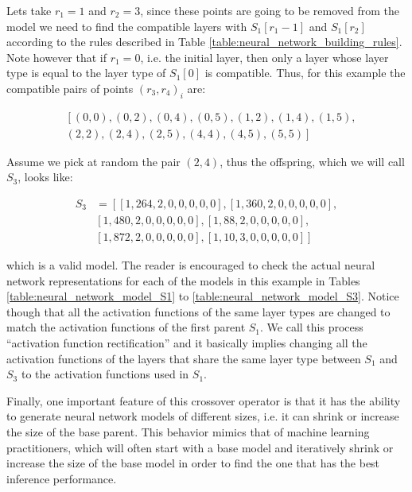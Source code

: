 \documentclass[journal]{IEEEtran}
\begin{document}
Lets take $r_1 = 1$ and $r_2 = 3$, since these points are going to be removed from the model we need to find the compatible layers with $S_1[r_1-1]$ and $S_1[r_2]$ according to the rules described in Table \ref{table:neural_network_building_rules}. Note however that if $r_1 = 0$, i.e. the initial layer, then only a layer whose layer type is equal to the layer type of $S_1[0]$ is compatible. Thus, for this example the compatible pairs of points $(r_3, r_4)_i$ are:

\begin{align*}
& \left[ (0, 0), (0, 2), (0, 4), (0, 5), (1, 2), (1, 4), (1, 5), \right. \\
& \left. (2, 2), (2, 4), (2, 5), (4, 4), (4, 5), (5, 5) \right]
\end{align*} 

Assume we pick at random the pair $(2,4)$, thus the offspring, which we will call $S_3$, looks like:

\begin{align*}
S_3 & = \left[ \left[1, 264, 2, 0, 0, 0, 0, 0 \right], \left[1, 360, 2, 0, 0, 0, 0, 0 \right], \right. \\
& \left. \left[1, 480, 2, 0, 0, 0, 0, 0 \right] , \left[1, 88, 2, 0, 0, 0, 0, 0 \right], \right. \\
& \left. \left[1, 872, 2, 0, 0, 0, 0, 0 \right], \left[1, 10, 3, 0, 0, 0, 0, 0 \right] \right]
\end{align*}

which is a valid model. The reader is encouraged to check the actual neural network representations for each of the models in this example in Tables \ref{table:neural_network_model_S1} to \ref{table:neural_network_model_S3}. Notice though that all the activation functions of the same layer types are changed to match the activation functions of the first parent $S_1$. We call this process ``activation function rectification'' and it basically implies changing all the activation functions of the layers that share the same layer type between $S_1$ and $S_3$ to the activation functions used in $S_1$. 

Finally, one important feature of this crossover operator is that it has the ability to generate neural network models of different sizes, i.e. it can shrink or increase the size of the base parent. This behavior mimics that of machine learning practitioners, which will often start with a base model and iteratively shrink or increase the size of the base model in order to find the one that has the best inference performance.
\end{document}
